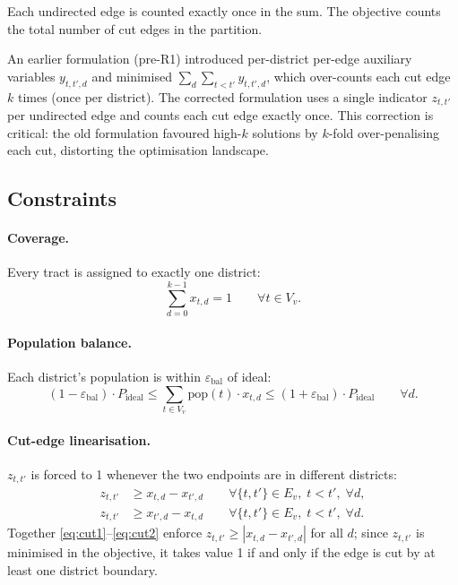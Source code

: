 Each undirected edge is counted exactly once in the sum.
The objective counts the total number of cut edges in the partition.

\begin{remark}
An earlier formulation (pre-R1) introduced per-district per-edge auxiliary
variables $y_{t,t',d}$ and minimised $\sum_d \sum_{t<t'} y_{t,t',d}$,
which over-counts each cut edge $k$ times (once per district).
The corrected formulation uses a single indicator $z_{t,t'}$ per undirected
edge and counts each cut edge exactly once.
This correction is critical: the old formulation favoured high-$k$ solutions
by $k$-fold over-penalising each cut, distorting the optimisation landscape.
\end{remark}

\subsection{Constraints}

\paragraph{Coverage.}
Every tract is assigned to exactly one district:
\begin{equation}
\label{eq:coverage}
\sum_{d=0}^{k-1} x_{t,d} = 1 \qquad \forall t \in V_v.
\end{equation}

\paragraph{Population balance.}
Each district's population is within $\varepsilon_{\mathrm{bal}}$ of ideal:
\begin{equation}
\label{eq:balance}
(1 - \varepsilon_{\mathrm{bal}}) \cdot P_{\mathrm{ideal}}
\leq \sum_{t \in V_v} \mathrm{pop}(t) \cdot x_{t,d}
\leq (1 + \varepsilon_{\mathrm{bal}}) \cdot P_{\mathrm{ideal}}
\qquad \forall d.
\end{equation}

\paragraph{Cut-edge linearisation.}
$z_{t,t'}$ is forced to 1 whenever the two endpoints are in different
districts:
\begin{align}
z_{t,t'} &\geq x_{t,d} - x_{t',d}
  \qquad \forall \{t,t'\} \in E_v,\; t < t',\; \forall d, \label{eq:cut1} \\
z_{t,t'} &\geq x_{t',d} - x_{t,d}
  \qquad \forall \{t,t'\} \in E_v,\; t < t',\; \forall d. \label{eq:cut2}
\end{align}
Together \eqref{eq:cut1}--\eqref{eq:cut2} enforce $z_{t,t'} \geq |x_{t,d} - x_{t',d}|$
for all $d$; since $z_{t,t'}$ is minimised in the objective, it takes
value 1 if and only if the edge is cut by at least one district boundary.

